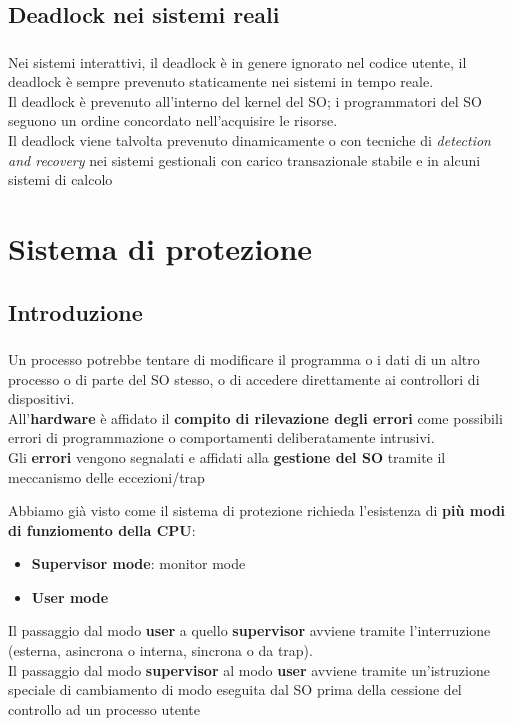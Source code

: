 \documentclass{beamer}
\newenvironment{mainframe}{
	\begin{frame}
		\frametitle{\insertsubsection}
		\framesubtitle{\insertsection}
	}{
	\end{frame}
}
\begin{document}
\subsection{Deadlock nei sistemi reali}
\begin{mainframe}
	Nei sistemi interattivi, il deadlock è in genere ignorato nel codice utente, il deadlock è sempre prevenuto staticamente nei sistemi in tempo reale.\\
	Il deadlock è prevenuto all'interno del kernel del SO; i programmatori del SO seguono un ordine concordato nell'acquisire le risorse.\\
	Il deadlock viene talvolta prevenuto dinamicamente o con tecniche di \textit{detection and  recovery} nei sistemi gestionali con carico transazionale stabile e in alcuni sistemi di calcolo
\end{mainframe}
\section{Sistema di protezione}
\subsection{Introduzione}
\begin{mainframe}
	Un processo potrebbe tentare di modificare il programma o i dati di un altro processo o di parte del SO stesso, o di accedere direttamente ai controllori di dispositivi.\\
	All'\textbf{hardware} è affidato il \textbf{compito di rilevazione degli errori} come possibili errori di programmazione o comportamenti deliberatamente intrusivi.\\
	Gli \textbf{errori} vengono segnalati e affidati alla \textbf{gestione del SO} tramite il meccanismo delle eccezioni/trap
\end{mainframe}
\begin{frame}
	Abbiamo già visto come il sistema di protezione richieda l'esistenza di \textbf{più modi di funziomento della CPU}:
	\begin{itemize}
		\item \textbf{Supervisor mode}: monitor mode
		\item \textbf{User mode}
	\end{itemize}
	Il passaggio dal modo \textbf{user} a quello \textbf{supervisor} avviene tramite l'interruzione (esterna, asincrona o interna, sincrona o da trap).\\
	Il passaggio dal modo \textbf{supervisor} al modo \textbf{user} avviene tramite un'istruzione speciale di cambiamento di modo eseguita dal SO prima della cessione del controllo ad un processo utente
\end{frame}
\end{document}
